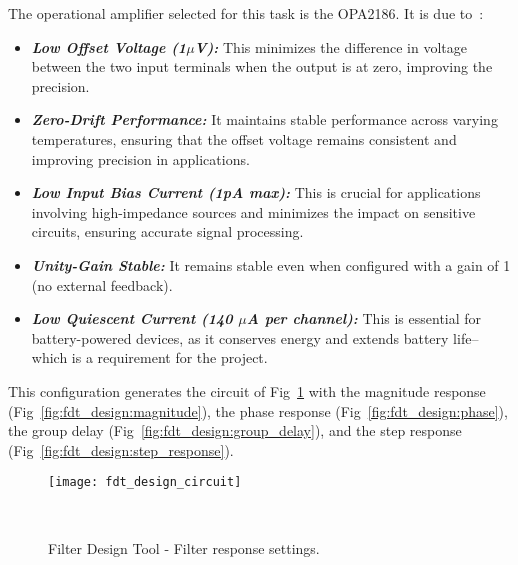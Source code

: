 The operational amplifier selected for this task is the OPA2186. It is due to~\cite{opax186_datasheet}:

\begin{itemize}
    \item \textit{\textbf{Low Offset Voltage (1$\mu$V):}} This minimizes the difference in voltage between the two input terminals when the output is at zero, improving the precision.

    \item \textit{\textbf{Zero-Drift Performance:}} It maintains stable performance across varying temperatures, ensuring that the offset voltage remains consistent and improving precision in applications.

    \item \textit{\textbf{Low Input Bias Current (1pA max):}} This is crucial for applications involving high-impedance sources and minimizes the impact on sensitive circuits, ensuring accurate signal processing.

    \item \textit{\textbf{Unity-Gain Stable:}} It remains stable even when configured with a gain of 1 (no external feedback).

    \item \textit{\textbf{Low Quiescent Current (140 $\mu$A per channel):}} This is essential for battery-powered devices, as it conserves energy and extends battery life--which is a requirement for the project.
\end{itemize}

This configuration generates the circuit of Fig~\ref{fig:fdt_design_circuit} with the magnitude response (Fig~\ref{fig:fdt_design:magnitude}), the phase response (Fig~\ref{fig:fdt_design:phase}), the group delay (Fig~\ref{fig:fdt_design:group_delay}), and the step response (Fig~\ref{fig:fdt_design:step_response}).

\begin{figure}[H]
    \centering
    \texttt{[image: fdt\_design\_circuit]}
    \caption{Filter Design Tool - Filter response settings.}
~\label{fig:fdt_design_circuit}
\end{figure}

